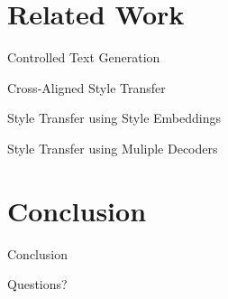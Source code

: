 \documentclass[aspectratio=169]{beamer}
\begin{document}
% 

\section{Related Work}

\begin{frame}{Controlled Text Generation}
\end{frame}

\begin{frame}{Cross-Aligned Style Transfer}
\end{frame}

\begin{frame}{Style Transfer using Style Embeddings}
\end{frame}

\begin{frame}{Style Transfer using Muliple Decoders}
\end{frame}

% 

\section{Conclusion}

\begin{frame}{Conclusion}
\end{frame}

\begin{frame}[allowframebreaks]
	\tiny
	
\end{frame}

\begin{frame}
	\centering
	\Huge{Questions?}
\end{frame}
\end{document}
